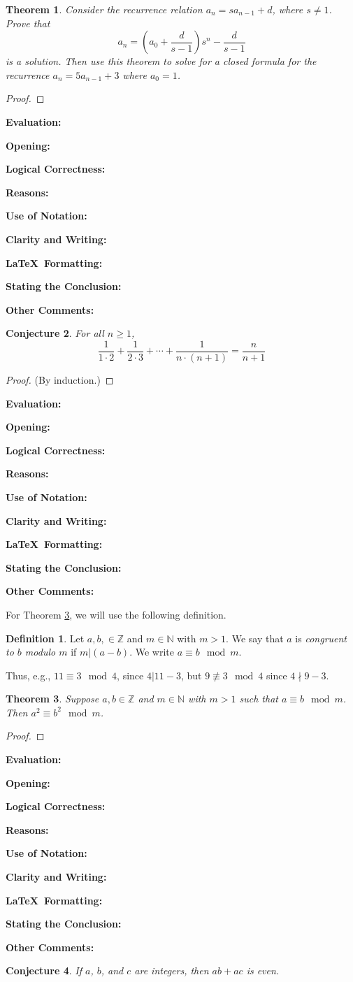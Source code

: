 \documentclass[11pt,titlepage]{article}		%
\def\rubric{\textbf{Evaluation:} \makebox[0.75in]{\hrulefill}

\vspace{.3in}

\textbf{Opening:} \makebox[0.75in]{\hrulefill}

\vspace{.3in}

\textbf{Logical Correctness:} \makebox[0.75in]{\hrulefill}

\vspace{.3in}

\textbf{Reasons:} \makebox[0.75in]{\hrulefill}

\vspace{.3in}

\textbf{Use of Notation:} \makebox[0.75in]{\hrulefill}

\vspace{.3in}

\textbf{Clarity and Writing:} \makebox[0.75in]{\hrulefill}

\vspace{.3in}

\textbf{\LaTeX\ Formatting:} \makebox[0.75in]{\hrulefill}

\vspace{.3in}

\textbf{Stating the Conclusion:} \makebox[0.75in]{\hrulefill}

\vspace{.3in}

\textbf{Other Comments:}

\vspace{1in}

}
\def\Z{{\mathbb Z}}
\def\N{{\mathbb N}}
\theoremstyle{theorem}
\newtheorem{theorem}{Theorem}
\newtheorem{conjecture}[theorem]{Conjecture}
\theoremstyle{definition}
\newtheorem{definition}{Definition}
\begin{document}
\clearpage

\begin{theorem}
    Consider the recurrence relation $a_n = s a_{n-1}+d$, where $s\ne 1$.
    Prove that
    \[
        a_n = \left(a_0 + \frac{d}{s-1}\right) s^n - \frac{d}{s-1}
    \]
    is a solution. Then use this theorem to solve for a closed formula for the recurrence $a_n = 5 a_{n-1} + 3$ where $a_0 = 1$.
\end{theorem}

\begin{proof}

\end{proof}

\rubric


\clearpage


\begin{conjecture}
    For all $n\ge 1$,
    \[
        \frac{1}{1\cdot 2} + \frac{1}{2\cdot 3} + \cdots + \frac{1}{n\cdot(n+1)} = \frac{n}{n+1}
    \]
\end{conjecture}

\begin{proof}
(By induction.)
\end{proof}

\rubric


\clearpage

For Theorem \ref{thm:modular-squares}, we will use the following definition.

\begin{definition}
    Let $a,b,\in\Z$ and $m\in \N$ with $m > 1$.
    We say that $a$ is \emph{congruent to $b$ modulo $m$} if $m|(a-b)$.
    We write $a \equiv b\mod m$.
\end{definition}

Thus, e.g., $11\equiv 3\mod 4$, since $4|11-3$, but $9\not\equiv 3\mod 4$ since $4\nmid 9-3$.

\begin{theorem}\label{thm:modular-squares}
    Suppose $a,b\in \Z$ and $m\in \N$ with $m > 1$ such that $a\equiv b\mod m$.
    Then $a^2 \equiv b^2\mod m$.
\end{theorem}

\begin{proof}

\end{proof}

\rubric



\clearpage



\begin{conjecture}
    If $a$, $b$, and $c$ are integers, then $ab+ac$ is even.
\end{conjecture}
\end{document}
